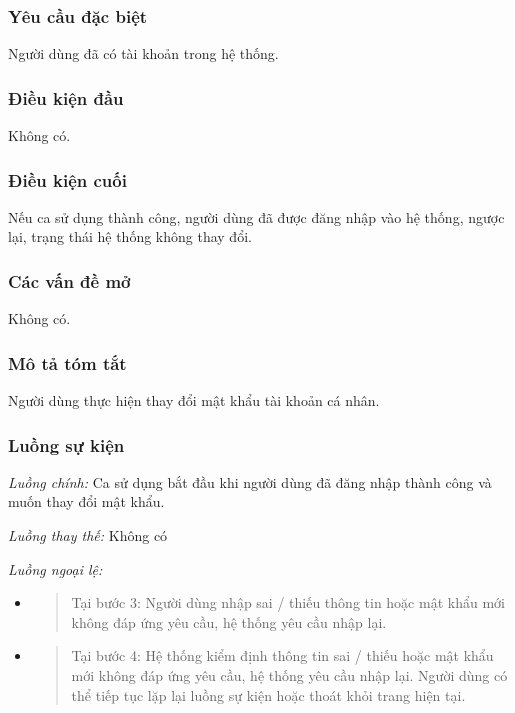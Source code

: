 \documentclass[./../main.tex]{subfiles}
\begin{document}
\subsubsection*{Yêu cầu đặc biệt}

Người dùng đã có tài khoản trong hệ thống.

\subsubsection*{Điều kiện đầu}

Không có.

\subsubsection*{Điều kiện cuối}

Nếu ca sử dụng thành công, người dùng đã được đăng nhập vào hệ thống,
ngược lại, trạng thái hệ thống không thay đổi.

\subsubsection*{Các vấn đề mở}

Không có.

\subsubsection*{Mô tả tóm tắt}

Người dùng thực hiện thay đổi mật khẩu tài khoản cá nhân.

\subsubsection*{Luồng sự kiện}

\emph{Luồng chính:} Ca sử dụng bắt đầu khi người dùng đã đăng nhập thành
công và muốn thay đổi mật khẩu.

\emph{Luồng thay thế:} Không có

\emph{Luồng ngoại lệ:}

\begin{itemize}
\item
  \begin{quote}
  Tại bước 3: Người dùng nhập sai / thiếu thông tin hoặc mật khẩu mới
  không đáp ứng yêu cầu, hệ thống yêu cầu nhập lại.
  \end{quote}
\item
  \begin{quote}
  Tại bước 4: Hệ thống kiểm định thông tin sai / thiếu hoặc mật khẩu mới
  không đáp ứng yêu cầu, hệ thống yêu cầu nhập lại. Người dùng có thể
  tiếp tục lặp lại luồng sự kiện hoặc thoát khỏi trang hiện tại.
  \end{quote}
\end{itemize}
\end{document}
